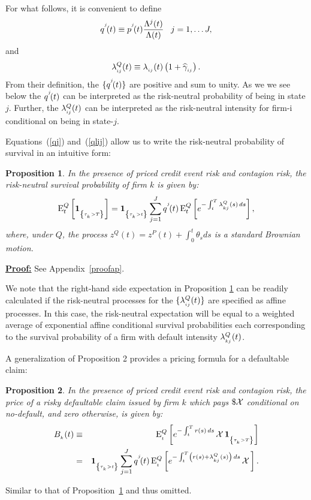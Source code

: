 \documentclass[titlepage,11pt]{article}
\def\bq{\begin{equation}}
\def\eq{\end{equation}}
\newtheorem{proposition}{Proposition}
\begin{document}
For what follows, it is convenient to define \bq\label{qj} \qj(t)
\equiv \pj(t)\frac{\Lambda^j(t)}{\Lambda(t)}\,\,\,\,\,j=1,\ldots J,
\eq and \bq\label{qlij} \lambda\sub{ij}^{Q}(t) \equiv
\lambda\sub{ij}(t) \left( 1 + \hg\sub{ij} \right). \eq From their
definition, the $\{q^{^{{j}}}\!(t)\}$ are positive and sum to unity. As we we
see below the $q^{^{{j}}}\!(t)$ can be interpreted as the risk-neutral
probability of being in state $j$.  Further,  the
$\lambda_{_{{ij}}}^{Q}(t)$ can be interpreted as the risk-neutral
intensity for firm-i conditional on being in state-$j$.

Equations~(\ref{qj}) and~(\ref{qlij}) allow us to write the
risk-neutral probability of survival in an intuitive form:
\begin{proposition}\label{propqsur}
In the presence of priced credit event risk and contagion risk, the
risk-neutral survival probability of firm $k$ is given by:
\bq\label{propqsureq} \E^Q_t\left[\ind{\tau\sub{k}>T}\right] =
\ind{\tau\sub{k}>t} \sum_{j=1}^J \qj(t) \,
\E^{Q}_t\left[e^{-\int_t^T\lambda\sub{kj}^{Q}(s) \,ds}\right], \eq
where, under $Q$, the process $z^{Q}(t)=z^P(t)+\int_0^t \theta_s ds$
is a standard Brownian motion.
\end{proposition}
\noindent \underline{\bf Proof:} See Appendix~\ref{proofap}.\eproof

\vspace*{2mm} \noindent

We note that the right-hand side expectation in Proposition
\ref{propqsur} can be readily calculated if the risk-neutral
processes for the $\{\lambda_{_{{ij}}}^{Q}(t)\}$ are specified as
affine processes.  In this case, the risk-neutral expectation will
be equal  to a weighted average of exponential affine conditional
survival probabilities each corresponding to the survival
probability of a firm with default intensity
$\lambda_{_{{kj}}}^{Q}(t)$.

A generalization of Proposition 2 provides a pricing formula for a
defaultable claim:

\begin{proposition}\label{prop76}
In the presence of priced credit event risk and contagion risk, the
price of a risky defaultable claim issued  by firm  $k$ which pays
$\${\cal X}$ conditional on no-default, and zero otherwise, is given
by:
\begin{eqnarray}
B\sub{k}(t) &\equiv& \E^Q\sub{t}\left[e^{-\int_t^T r(s) \, ds} \,
{\cal X} \, \ind{\tau\sub{k}
> T}\right] \nonumber \\ \label{bkt}
%
&=&\ind{\tau\sub{k} > t} \sum_{j=1}^{J} \qj(t) \,
\E^{Q}\sub{t}\left[e^{-\int_t^T
\left(r(s)+\lambda\sub{kj}^{Q}(s)\right) \, ds} \, {\cal X} \,
\right].
\end{eqnarray}
\end{proposition}
 Similar to that of Proposition~\ref{propqsur}
and thus omitted.\eproof
\end{document}
